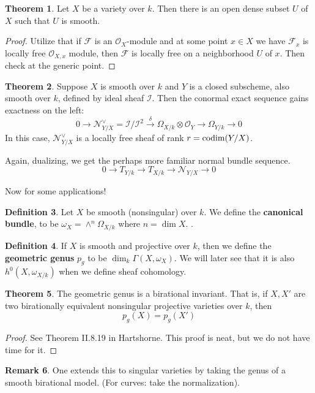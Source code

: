 \documentclass[10pt,reqno]{amsart}
\theoremstyle{definition}
\newtheorem{theorem}{Theorem}
\newtheorem{definition}[theorem]{Definition}
\newtheorem{remark}[theorem]{Remark}
\theoremstyle{remark}
\numberwithin{equation}{section}
\numberwithin{theorem}{section}
\newcommand{\OO}{{\mathcal O}}
\newcommand{\codim}{\textup{codim}}
\newcommand{\FF}{{\mathscr F}}
\newcommand{\NN}{{\mathscr N}}
\newcommand{\II}{{\mathscr I}}
\begin{document}
\begin{theorem} Let $X$ be a variety over $k$. Then there is an open dense subset $U$ of $X$ such that $U$ is smooth. 
\end{theorem}
\begin{proof}
Utilize that if $\FF$ is an $\OO_X$-module and at some point $x \in X$ we have $\FF_x$ is locally free $\OO_{X,x}$ module, then $\FF$ is locally free on a neighborhood $U$ of $x$. Then check at the generic point.
\end{proof}

\begin{theorem} Suppose $X$ is smooth over $k$ and $Y$ is a closed subscheme, also smooth over $k$, defined by ideal sheaf $\II$. Then the conormal exact sequence gains exactness on the left:
\[0 \to \NN^{\vee}_{Y/X} = \II/\II^2 \stackrel{\delta}{\to} \Omega_{X/k} \otimes \OO_Y \to \Omega_{Y/k} \to 0\]
In this case, $\NN^{\vee}_{Y/X}$ is a locally free sheaf of rank $r = \codim(Y/X)$.
\end{theorem}

Again, dualizing, we get the perhaps more familiar normal bundle sequence.
\[0 \to T_{Y/k} \to T_{X/k} \to \NN_{Y/X} \to 0\]

Now for some applications!

\begin{definition} Let $X$ be smooth (nonsingular) over $k$. We define the \textbf{canonical bundle}, to be $\omega_X = \wedge^n \Omega_{X/k}$ where $n = \dim X$. .
\end{definition}

\begin{definition} If $X$ is smooth and projective over $k$, then we define the \textbf{geometric genus} $p_g$ to be $\dim_k \Gamma(X,\omega_X)$. We will later see that it is also $h^0(X, \omega_{X/k})$ when we define sheaf cohomology.
\end{definition}

\begin{theorem} The geometric genus is a birational invariant. That is, if $X,X'$ are two birationally equivalent nonsingular projective varieties over $k$, then 
\[p_g(X) = p_g(X')\]
\end{theorem}
\begin{proof}
See Theorem II.8.19 in Hartshorne. This proof is neat, but we do not have time for it.
\end{proof}

\begin{remark} One extends this to singular varieties by taking the genus of a smooth birational model. (For curves: take the normalization).
\end{remark}
\end{document}
